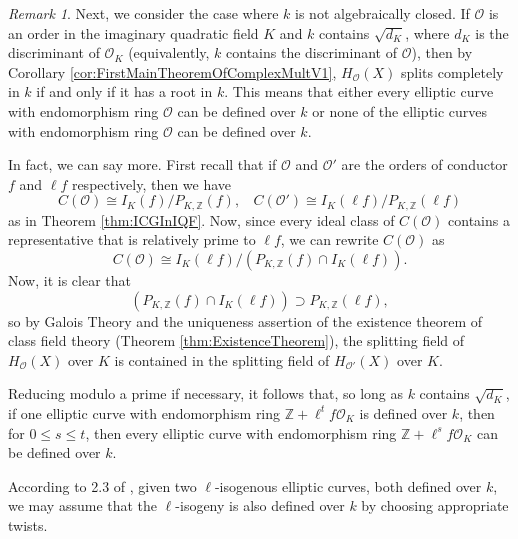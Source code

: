 \documentclass{amsart}
\theoremstyle{definition}
\theoremstyle{remark}
\newtheorem{remark}[thm]{Remark}
\numberwithin{equation}{section}
\newcommand{\cO}{\mathcal O}
\newcommand{\bbZ}{\mathbb Z}
\begin{document}
\begin{remark} \label{rem:kNotAlgClosed}
Next, we consider the case where $k$ is not algebraically closed. If $\cO$ is an order in the imaginary quadratic field $K$ and $k$ contains $\sqrt{d_{K}}$, where $d_{K}$ is the discriminant of $\cO_{K}$ (equivalently, $k$ contains the discriminant of $\cO$), then by Corollary \ref{cor:FirstMainTheoremOfComplexMultV1}, $H_{\cO}(X)$ splits completely in $k$ if and only if it has a root in $k$. This means that either every elliptic curve with endomorphism ring $\cO$ can be defined over $k$ or none of the elliptic curves with endomorphism ring $\cO$ can be defined over $k$. 

In fact, we can say more. First recall that if $\cO$ and $\cO'$ are the orders of conductor $f$ and $\ell f$ respectively, then we have 
\[
C(\cO) \cong  I_{K}(f)/P_{K, \bbZ}(f), \ \ \ \ C(\cO') \cong  I_{K}(\ell f)/P_{K, \bbZ}(\ell f)
\]
as in Theorem \ref{thm:ICGInIQF}. Now, since every ideal class of $C(\cO)$ contains a representative that is relatively prime to $\ell f$, we can rewrite $C(\cO)$ as 
\[
C(\cO) \cong  I_{K}(\ell f)/(P_{K, \bbZ}(f) \cap I_{K}(\ell f)).
\]
Now, it is clear that 
\[
(P_{K, \bbZ}(f) \cap I_{K}(\ell f)) \supset P_{K, \bbZ}(\ell f),
\]
so by Galois Theory and the uniqueness assertion of the existence theorem of class field theory (Theorem \ref{thm:ExistenceTheorem}), the splitting field of $H_{\cO}(X)$ over $K$ is contained in the splitting field of $H_{\cO'}(X)$ over $K$. 

 Reducing modulo a prime if necessary, it follows that, so long as $k$ contains $\sqrt{d_{K}}$, if one elliptic curve with endomorphism ring $\bbZ + \ell^t f \cO_{K}$ is defined over $k$, then for $0 \leq s \leq t$, then every elliptic curve with endomorphism ring $\bbZ + \ell^s f \cO_{K}$ can be defined over $k$.
 \end{remark}
 
 According to 2.3 of \cite{SutherlandIV}, given two $\ell$-isogenous elliptic curves, both defined over $k$, we may assume that the $\ell$-isogeny is also defined over $k$ by choosing appropriate twists.
 
\end{document}
